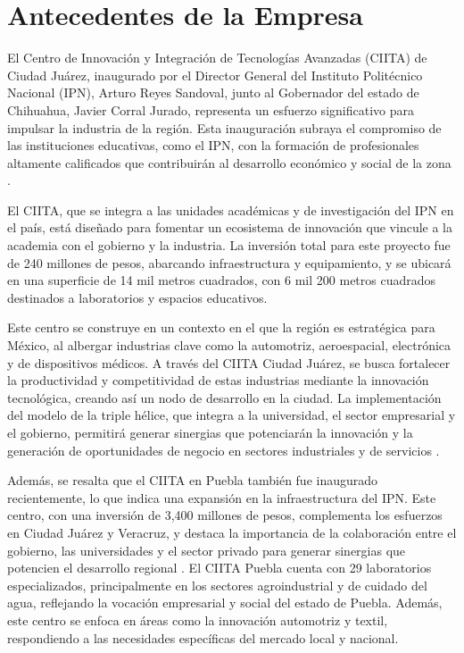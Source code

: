 \section{Antecedentes de la Empresa}

El Centro de Innovación y Integración de Tecnologías Avanzadas (CIITA) de Ciudad Juárez, inaugurado por el Director General del Instituto Politécnico Nacional (IPN), Arturo Reyes Sandoval, junto al Gobernador del estado de Chihuahua, Javier Corral Jurado, representa un esfuerzo significativo para impulsar la industria de la región. Esta inauguración subraya el compromiso de las instituciones educativas, como el IPN, con la formación de profesionales altamente calificados que contribuirán al desarrollo económico y social de la zona \cite{ipn_inauguracion_citta_juarez}.

El CIITA, que se integra a las unidades académicas y de investigación del IPN en el país, está diseñado para fomentar un ecosistema de innovación que vincule a la academia con el gobierno y la industria. La inversión total para este proyecto fue de 240 millones de pesos, abarcando infraestructura y equipamiento, y se ubicará en una superficie de 14 mil metros cuadrados, con 6 mil 200 metros cuadrados destinados a laboratorios y espacios educativos.

Este centro se construye en un contexto en el que la región es estratégica para México, al albergar industrias clave como la automotriz, aeroespacial, electrónica y de dispositivos médicos. A través del CIITA Ciudad Juárez, se busca fortalecer la productividad y competitividad de estas industrias mediante la innovación tecnológica, creando así un nodo de desarrollo en la ciudad. La implementación del modelo de la triple hélice, que integra a la universidad, el sector empresarial y el gobierno, permitirá generar sinergias que potenciarán la innovación y la generación de oportunidades de negocio en sectores industriales y de servicios \cite{ipn_inauguracion_citta_juarez}.

Además, se resalta que el CIITA en Puebla también fue inaugurado recientemente, lo que indica una expansión en la infraestructura del IPN. Este centro, con una inversión de 3,400 millones de pesos, complementa los esfuerzos en Ciudad Juárez y Veracruz, y destaca la importancia de la colaboración entre el gobierno, las universidades y el sector privado para generar sinergias que potencien el desarrollo regional \cite{diario_cambio_citta_puebla}. El CIITA Puebla cuenta con 29 laboratorios especializados, principalmente en los sectores agroindustrial y de cuidado del agua, reflejando la vocación empresarial y social del estado de Puebla. Además, este centro se enfoca en áreas como la innovación automotriz y textil, respondiendo a las necesidades específicas del mercado local y nacional.

